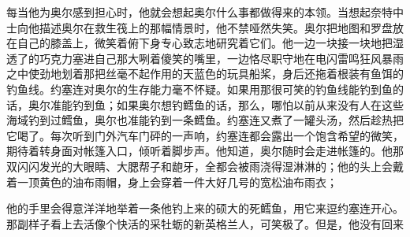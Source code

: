     每当他为奥尔感到担心时，他就会想起奥尔什么事都做得来的本领。当想起奈特中士向他描述奥尔在救生筏上的那幅情景时，他不禁哑然失笑。奥尔把地图和罗盘放在自己的膝盖上，微笑着俯下身专心致志地研究着它们。他一边一块接一块地把湿透了的巧克力塞进自己那大咧着傻笑的嘴里，一边恪尽职守地在电闪雷鸣狂风暴雨之中使劲地划着那把丝毫不起作用的天蓝色的玩具船桨，身后还拖着根装有鱼饵的钓鱼线。约塞连对奥尔的生存能力毫不怀疑。如果用那很可笑的钓鱼线能钓到鱼的话，奥尔准能钓到鱼；如果奥尔想钓鳕鱼的话，那么，哪怕以前从来没有人在这些海域钓到过鳕鱼，奥尔也准能钓到一条鳕鱼。约塞连又煮了一罐头汤，然后趁热把它喝了。每次听到门外汽车门砰的一声响，约塞连都会露出一个饱含希望的微笑，期待着转身面对帐篷入口，倾听着脚步声。他知道，奥尔随时会走进帐篷的。他那双闪闪发光的大眼睛、大腮帮子和龅牙，全都会被雨浇得湿淋淋的；他的头上会戴着一顶黄色的油布雨帽，身上会穿着一件大好几号的宽松油布雨衣；

    他的手里会得意洋洋地举着一条他钓上来的硕大的死鳕鱼，用它来逗约塞连开心。那副样子看上去活像个快活的采牡蛎的新英格兰人，可笑极了。但是，他没有回来
